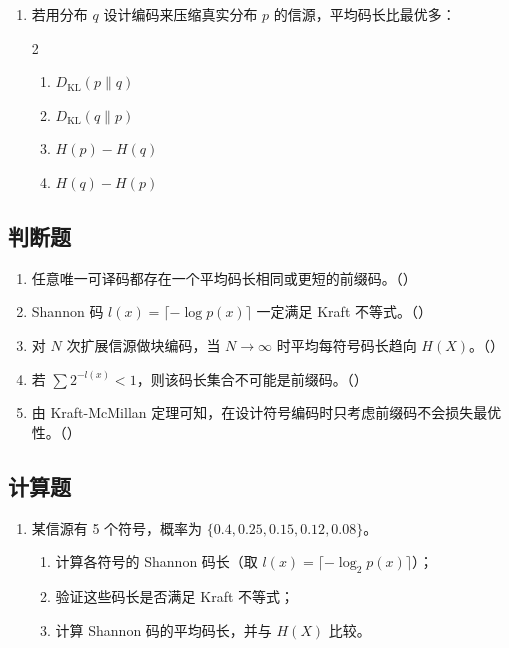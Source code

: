 \documentclass[12pt,a4paper]{ctexart}
\newcommand{\DKL}{D_{\mathrm{KL}}}
\begin{document}
\begin{enumerate}[label=\arabic*., leftmargin=*]
\item 若用分布 $q$ 设计编码来压缩真实分布 $p$ 的信源，平均码长比最优多：
\begin{multicols}{2}
\begin{enumerate}[label=(\Alph*)]
  \item $\DKL(p\|q)$
  \item $\DKL(q\|p)$
  \item $H(p) - H(q)$
  \item $H(q) - H(p)$
\end{enumerate}
\end{multicols}

\end{enumerate}

\subsection*{判断题}

\begin{enumerate}[label=\arabic*., leftmargin=*]
\item 任意唯一可译码都存在一个平均码长相同或更短的前缀码。（\quad）
\item Shannon 码 $l(x) = \lceil -\log p(x) \rceil$ 一定满足 Kraft 不等式。（\quad）
\item 对 $N$ 次扩展信源做块编码，当 $N \to \infty$ 时平均每符号码长趋向 $H(X)$。（\quad）
\item 若 $\sum 2^{-l(x)} < 1$，则该码长集合不可能是前缀码。（\quad）
\item 由 Kraft-McMillan 定理可知，在设计符号编码时只考虑前缀码不会损失最优性。（\quad）
\end{enumerate}

\subsection*{计算题}

\begin{enumerate}[label=\textbf{\arabic*.}, leftmargin=*]
\item 某信源有 5 个符号，概率为 $\{0.4, 0.25, 0.15, 0.12, 0.08\}$。
\begin{enumerate}
  \item 计算各符号的 Shannon 码长（取 $l(x) = \lceil -\log_2 p(x) \rceil$）；
  \item 验证这些码长是否满足 Kraft 不等式；
  \item 计算 Shannon 码的平均码长，并与 $H(X)$ 比较。
\end{enumerate}
\end{enumerate}
\end{document}
